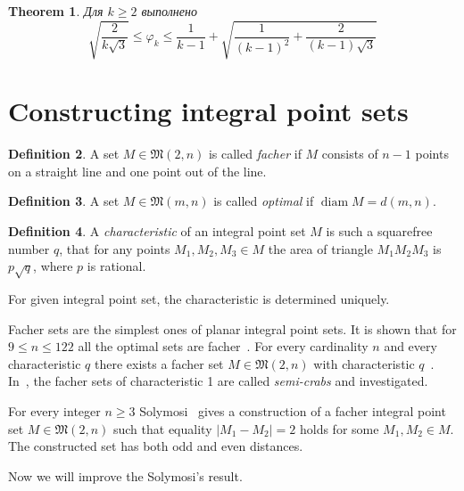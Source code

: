 \documentclass[a4paper,14pt]{article} %
\theoremstyle{plain}
\newtheorem{theorem}{Theorem}[section]
\theoremstyle{definition}
\newtheorem{definition}[theorem]{Definition}
\begin{document}
\begin{theorem}%
	\label{thm:varphi_k_bounds}
	\cite{costa2013valid}
	Для $k\geq 2$ выполнено
	\begin{equation*}
		\sqrt{\frac{2}{k\sqrt{3}}}
		\leq
		\varphi_k
		\leq
		\frac{1}{k-1} +
		\sqrt{
			\frac{1}{(k-1)^2}
			+
			\frac{2}{(k-1)\sqrt{3}}
		}
	\end{equation*}
\end{theorem}



\section{Constructing integral point sets}

\begin{definition}
	A set $M\in\mathfrak{M}(2,n)$ is called \textit{facher}
	if $M$ consists of $n-1$ points on a straight line
	and one point out of the line.
\end{definition}

\begin{definition}
	A set $M\in\mathfrak{M}(m,n)$ is called \textit{optimal}
	if $\operatorname{diam}M=d(m,n)$.
\end{definition}

\begin{definition}
	\cite{kurz2005characteristic}
	A \textit{characteristic} of an integral point set $M$ is such a squarefree number $q$,
	that for any points $M_1, M_2, M_3 \in M$ the area of triangle $M_1 M_2 M_3$
	is $p\sqrt{q}$, where $p$ is rational.
\end{definition}
For given integral point set, the characteristic is determined uniquely.

Facher sets are the simplest ones of planar integral point sets.
It is shown that for $9\leq n \leq 122$ all the optimal sets are facher~\cite{kurz2008minimum}.
For every cardinality $n$ and every characteristic $q$
there exists a facher set $M\in\mathfrak{M}(2,n)$ with characteristic $q$~\cite[Theorem 5]{our-vmmsh-2018}.
In~\cite{antonov2008maximal}, the facher sets of characteristic 1 are called \textit{semi-crabs} and investigated.

For every integer $n\geq 3$ Solymosi~\cite{solymosi2003note} gives a construction of a facher integral point set
$M\in\mathfrak{M}(2,n)$
such that equality $|M_1 - M_2| = 2$ holds for some $M_1, M_2 \in M$.
The constructed set has both odd and even distances.

Now we will improve the Solymosi's result.
\end{document}
